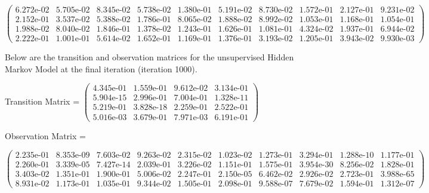 \small
$\begin{pmatrix}
6.272\text{e-}02 & 5.705\text{e-}02 & 8.345\text{e-}02 & 5.738\text{e-}02 & 1.380\text{e-}01 & 5.191\text{e-}02 & 8.730\text{e-}02 & 1.572\text{e-}01 & 2.127\text{e-}01 & 9.231\text{e-}02\\
2.152\text{e-}01 & 3.537\text{e-}02 & 5.388\text{e-}02 & 1.786\text{e-}01 & 8.065\text{e-}02 & 1.888\text{e-}02 & 8.992\text{e-}02 & 1.053\text{e-}01 & 1.168\text{e-}01 & 1.054\text{e-}01\\
1.988\text{e-}02 & 8.040\text{e-}02 & 1.846\text{e-}01 & 1.378\text{e-}02 & 1.243\text{e-}01 & 1.626\text{e-}01 & 1.081\text{e-}01 & 4.324\text{e-}02 & 1.937\text{e-}01 & 6.944\text{e-}02\\
2.222\text{e-}01 & 1.001\text{e-}01 & 5.614\text{e-}02 & 1.652\text{e-}01 & 1.169\text{e-}01 & 1.376\text{e-}01 & 3.193\text{e-}02 & 1.205\text{e-}01 & 3.943\text{e-}02 & 9.930\text{e-}03 
\end{pmatrix}$
\normalsize
\medskip

Below are the transition and observation matrices for the unsupervised Hidden Markov Model at the final iteration (iteration 1000).

Transition Matrix = \small $\begin{pmatrix}
    4.345\text{e-}01 & 1.559\text{e-}01 & 9.612\text{e-}02 & 3.134\text{e-}01\\
    5.904\text{e-}15 & 2.996\text{e-}01 & 7.004\text{e-}01 & 1.328\text{e-}11\\
    5.219\text{e-}01 & 3.828\text{e-}18 & 2.259\text{e-}01 & 2.522\text{e-}01\\
    5.016\text{e-}03 & 3.679\text{e-}01 & 7.971\text{e-}03 & 6.191\text{e-}01 
\end{pmatrix}$ 
\normalsize

Observation Matrix =

\small
$\begin{pmatrix}
    2.235\text{e-}01 & 8.353\text{e-}09 & 7.603\text{e-}02 & 9.263\text{e-}02 & 2.315\text{e-}02 & 1.023\text{e-}02 & 1.273\text{e-}01 & 3.294\text{e-}01 & 1.288\text{e-}10 & 1.177\text{e-}01\\ 
    2.260\text{e-}01 & 3.339\text{e-}05 & 7.427\text{e-}14 & 2.039\text{e-}01 & 3.226\text{e-}02 & 1.151\text{e-}01 & 1.575\text{e-}01 & 3.954\text{e-}30 & 8.256\text{e-}02 & 1.828\text{e-}01\\  
    3.403\text{e-}02 & 1.351\text{e-}01 & 1.900\text{e-}01 & 5.006\text{e-}02 & 2.247\text{e-}01 & 2.150\text{e-}05 & 6.462\text{e-}02 & 2.926\text{e-}02 & 2.723\text{e-}01 & 3.988\text{e-}65\\   
    8.931\text{e-}02 & 1.173\text{e-}01 & 1.035\text{e-}01 & 9.344\text{e-}02 & 1.505\text{e-}01 & 2.098\text{e-}01 & 9.588\text{e-}07 & 7.679\text{e-}02 & 1.594\text{e-}01 & 1.312\text{e-}07   
\end{pmatrix}$
\normalsize
\medskip

